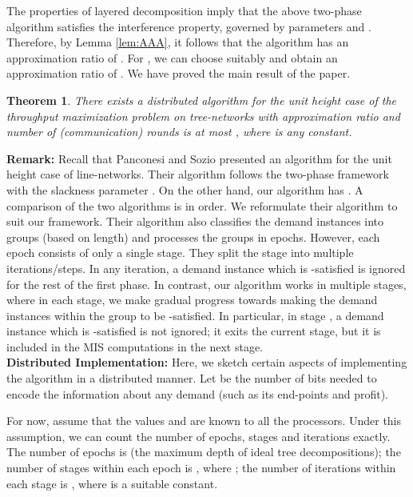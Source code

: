 \documentclass[11pt]{article}
\newtheorem{theorem}{\bf Theorem}[section]
\begin{document}
The properties of layered decomposition imply that the above two-phase algorithm satisfies the interference
property, governed by parameters  and .
Therefore, by Lemma \ref{lem:AAA}, it follows that the algorithm has an approximation ratio of .
For , we can choose  suitably and obtain an approximation ratio of .
We have proved the main result of the paper.

\begin{theorem}
\label{thm:main}
There exists a distributed algorithm for the unit height case of the throughput maximization problem on tree-networks 
with approximation ratio  and number of (communication) rounds is at most 
,
where  is any constant.
\end{theorem}

\noindent
{\bf Remark: }Recall that Panconesi and Sozio \cite{Pancc} presented an algorithm for the unit height case of
line-networks. Their algorithm follows the two-phase framework with the slackness parameter .
On the other hand, our algorithm has .
A comparison of the two algorithms is in order. We reformulate their algorithm to suit our framework.
Their algorithm also classifies the demand instances into groups 
(based on length) and processes the groups in epochs. However, 
each epoch consists of only a single stage. They split the stage into multiple iterations/steps.
In any iteration, a demand instance  which is -satisfied is ignored
for the rest of the first phase. In contrast, our algorithm works in multiple stages,
where in each stage, we make gradual progress towards making the demand instances
within the group to be -satisfied. In particular,
in stage , a demand instance which is -satisfied is not ignored;
it exits the current stage, but it is included in the MIS computations in the next stage.
\\

\noindent
{\bf Distributed Implementation: }
Here, we sketch certain aspects of implementing the algorithm in a distributed manner.
Let  be the number of bits needed to encode the information about any demand 
(such as its end-points and profit).

For now, assume that the values  and  are known to all the processors.
Under this assumption, we can count the number of epochs, stages and iterations exactly.
The number of epochs is  (the maximum depth of ideal tree decompositions); 
the number of stages within each epoch is , where ;
the number of iterations within each stage is , where  is a suitable constant.
\end{document}
